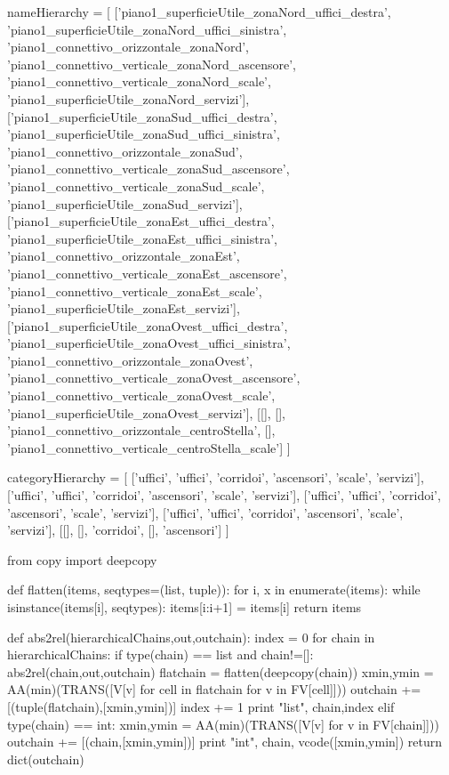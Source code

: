 nameHierarchy = [
 ['piano1_superficieUtile_zonaNord_uffici_destra',
  'piano1_superficieUtile_zonaNord_uffici_sinistra',
  'piano1_connettivo_orizzontale_zonaNord',
  'piano1_connettivo_verticale_zonaNord_ascensore',
  'piano1_connettivo_verticale_zonaNord_scale',
  'piano1_superficieUtile_zonaNord_servizi'],
 ['piano1_superficieUtile_zonaSud_uffici_destra',
  'piano1_superficieUtile_zonaSud_uffici_sinistra',
  'piano1_connettivo_orizzontale_zonaSud',
  'piano1_connettivo_verticale_zonaSud_ascensore',
  'piano1_connettivo_verticale_zonaSud_scale',
  'piano1_superficieUtile_zonaSud_servizi'],
 ['piano1_superficieUtile_zonaEst_uffici_destra',
  'piano1_superficieUtile_zonaEst_uffici_sinistra',
  'piano1_connettivo_orizzontale_zonaEst',
  'piano1_connettivo_verticale_zonaEst_ascensore',
  'piano1_connettivo_verticale_zonaEst_scale',
  'piano1_superficieUtile_zonaEst_servizi'],
 ['piano1_superficieUtile_zonaOvest_uffici_destra',
  'piano1_superficieUtile_zonaOvest_uffici_sinistra',
  'piano1_connettivo_orizzontale_zonaOvest',
  'piano1_connettivo_verticale_zonaOvest_ascensore',
  'piano1_connettivo_verticale_zonaOvest_scale',
  'piano1_superficieUtile_zonaOvest_servizi'],
 [[],
  [],
  'piano1_connettivo_orizzontale_centroStella',
  [],
  'piano1_connettivo_verticale_centroStella_scale']
]
  
categoryHierarchy = [
 ['uffici', 'uffici', 'corridoi', 'ascensori', 'scale', 'servizi'],
 ['uffici', 'uffici', 'corridoi', 'ascensori', 'scale', 'servizi'],
 ['uffici', 'uffici', 'corridoi', 'ascensori', 'scale', 'servizi'],
 ['uffici', 'uffici', 'corridoi', 'ascensori', 'scale', 'servizi'],
 [[], [], 'corridoi', [], 'ascensori']
]
  

from copy import deepcopy

def flatten(items, seqtypes=(list, tuple)):
    for i, x in enumerate(items):
        while isinstance(items[i], seqtypes):
            items[i:i+1] = items[i]
    return items


def abs2rel(hierarchicalChains,out,outchain):
	index = 0
	for chain in hierarchicalChains:
		if type(chain) == list and chain!=[]: 			
			abs2rel(chain,out,outchain)
			flatchain = flatten(deepcopy(chain))
			xmin,ymin = AA(min)(TRANS([V[v] for cell in flatchain for v in FV[cell]]))
			outchain += [(tuple(flatchain),[xmin,ymin])]
			index += 1
			print "list", chain,index
		elif type(chain) == int:
			xmin,ymin = AA(min)(TRANS([V[v] for v in FV[chain]]))
			outchain += [(chain,[xmin,ymin])]
			print "int", chain, vcode([xmin,ymin])
	return dict(outchain)
			
